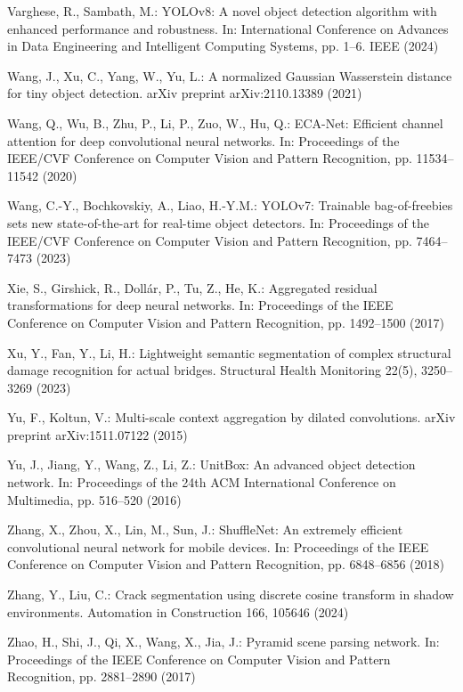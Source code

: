 \documentclass[twocolumn]{sn-jnl}
\begin{document}
		Varghese, R., Sambath, M.: YOLOv8: A novel object detection algorithm with enhanced performance and robustness. In: International Conference on Advances in Data Engineering and Intelligent Computing Systems, pp. 1–6. IEEE (2024)
		
		Wang, J., Xu, C., Yang, W., Yu, L.: A normalized Gaussian Wasserstein distance for tiny object detection. arXiv preprint arXiv:2110.13389 (2021)
		
		Wang, Q., Wu, B., Zhu, P., Li, P., Zuo, W., Hu, Q.: ECA-Net: Efficient channel attention for deep convolutional neural networks. In: Proceedings of the IEEE/CVF Conference on Computer Vision and Pattern Recognition, pp. 11534–11542 (2020)
		
		Wang, C.-Y., Bochkovskiy, A., Liao, H.-Y.M.: YOLOv7: Trainable bag-of-freebies sets new state-of-the-art for real-time object detectors. In: Proceedings of the IEEE/CVF Conference on Computer Vision and Pattern Recognition, pp. 7464–7473 (2023)
		
		Xie, S., Girshick, R., Dollár, P., Tu, Z., He, K.: Aggregated residual transformations for deep neural networks. In: Proceedings of the IEEE Conference on Computer Vision and Pattern Recognition, pp. 1492–1500 (2017)
		
		Xu, Y., Fan, Y., Li, H.: Lightweight semantic segmentation of complex structural damage recognition for actual bridges. Structural Health Monitoring 22(5), 3250–3269 (2023)
		
		Yu, F., Koltun, V.: Multi-scale context aggregation by dilated convolutions. arXiv preprint arXiv:1511.07122 (2015)
		
		Yu, J., Jiang, Y., Wang, Z., Li, Z.: UnitBox: An advanced object detection network. In: Proceedings of the 24th ACM International Conference on Multimedia, pp. 516–520 (2016)
		
		Zhang, X., Zhou, X., Lin, M., Sun, J.: ShuffleNet: An extremely efficient convolutional neural network for mobile devices. In: Proceedings of the IEEE Conference on Computer Vision and Pattern Recognition, pp. 6848–6856 (2018)
		
		Zhang, Y., Liu, C.: Crack segmentation using discrete cosine transform in shadow environments. Automation in Construction 166, 105646 (2024)
		
		Zhao, H., Shi, J., Qi, X., Wang, X., Jia, J.: Pyramid scene parsing network. In: Proceedings of the IEEE Conference on Computer Vision and Pattern Recognition, pp. 2881–2890 (2017)
		
\end{document}
